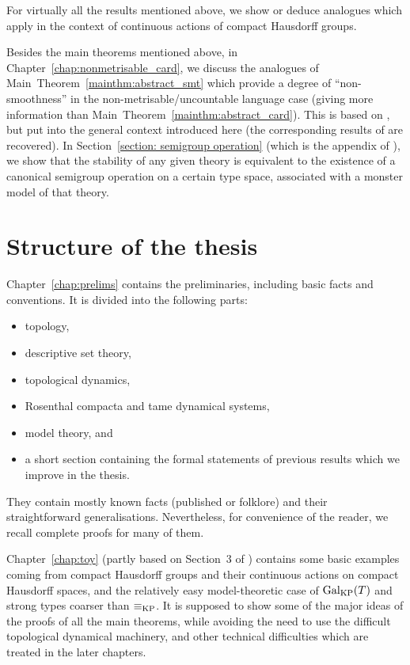 	For virtually all the results mentioned above, we show or deduce analogues which apply in the context of continuous actions of compact Hausdorff groups.
	
	Besides the main theorems mentioned above, in Chapter~\ref{chap:nonmetrisable_card}, we discuss the analogues of Main~Theorem~\ref{mainthm:abstract_smt} which provide a degree of ``non-smoothness'' in the non-metrisable/uncountable language case (giving more information than Main~Theorem~\ref{mainthm:abstract_card}). This is based on \cite{KPR15}, but put into the general context introduced here (the corresponding results of \cite{KPR15} are recovered). In Section~\ref{section: semigroup operation} (which is the appendix of \cite{KPR15}), we show that the stability of any given theory is equivalent to the existence of a canonical semigroup operation on a certain type space, associated with a monster model of that theory.
	
	\section{Structure of the thesis}
	Chapter~\ref{chap:prelims} contains the preliminaries, including basic facts and conventions. It is divided into the following parts:
	\begin{itemize}
		\item
		topology,
		\item
		descriptive set theory,
		\item
		topological dynamics,
		\item
		Rosenthal compacta and tame dynamical systems,
		\item
		model theory, and
		\item
		a short section containing the formal statements of previous results which we improve in the thesis.
	\end{itemize}
	They contain mostly known facts (published or folklore) and their straightforward generalisations. Nevertheless, for convenience of the reader, we recall complete proofs for many of them.
	
	Chapter~\ref{chap:toy} (partly based on Section~3 of \cite{KR18}) contains some basic examples coming from compact Hausdorff groups and their continuous actions on compact Hausdorff spaces, and the relatively easy model-theoretic case of $\operatorname{{Gal}}_{\mathrm{KP}}(T)$ and strong types coarser than $\equiv_{\mathrm{KP}}$. It is supposed to show some of the major ideas of the proofs of all the main theorems, while avoiding the need to use the difficult topological dynamical machinery, and other technical difficulties which are treated in the later chapters.
	
